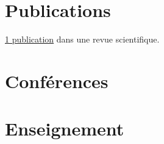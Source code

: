 \documentclass[a4paper,extended,fr]{adcv}
\begin{document}
    \section{Publications}

    \ifextended

        \begin{refsection}
            \nocite{Benshila_Etal_2020}
            \printbibliography[title={Revues scientifiques},heading=subbibliography]
        \end{refsection}



    \else
        \href{https://scholar.google.com/citations?user=tqxQbU0AAAAJ}{1 publication} dans une revue scientifique.
    \fi

    \ifextended
        \section{Conf{\'{e}}rences}

        \begin{adcvpresentations}
        \end{adcvpresentations}
    \fi

    \ifextended
        \section{Enseignement}
\end{document}
